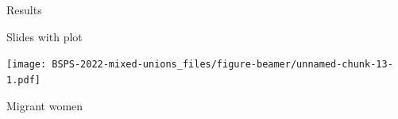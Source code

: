 \documentclass[
  ignorenonframetext,
]{beamer}
\newenvironment{Shaded}{\begin{snugshade}}{\end{snugshade}}
\newcommand{\FunctionTok}[1]{\textcolor[rgb]{0.28,0.35,0.67}{#1}}
\newcommand{\NormalTok}[1]{\textcolor[rgb]{0.00,0.23,0.31}{#1}}
\newcommand{\SpecialCharTok}[1]{\textcolor[rgb]{0.37,0.37,0.37}{#1}}
\begin{document}
\begin{frame}[fragile]{Results}
\protect\hypertarget{results-1}{}
\begin{block}{Slides with plot}
\protect\hypertarget{slides-with-plot}{}
\begin{Shaded}
\end{Shaded}

\texttt{[image: BSPS-2022-mixed-unions\_files/figure-beamer/unnamed-chunk-13-1.pdf]}
\end{block}

\begin{block}{Migrant women}
\protect\hypertarget{migrant-women}{}
\end{block}
\end{frame}
\end{document}
